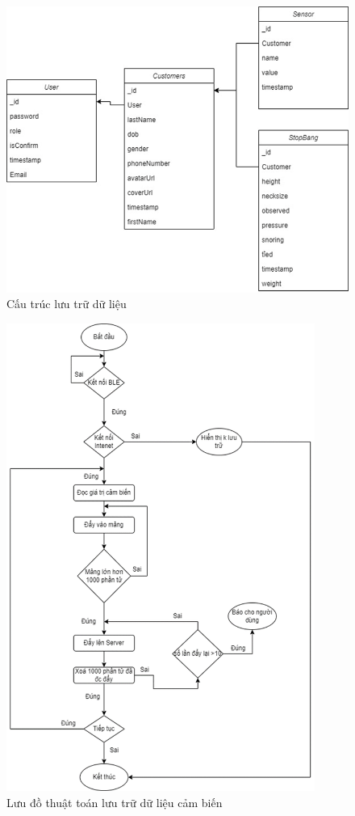 \begin{figure}[!]
		\centering
 		\includegraphics[width=1\textwidth]{images/csdl.png}
		\caption{Cấu trúc lưu trữ dữ liệu}
		\label{cloud}
\end{figure}
\begin{figure}[b!]
		\centering
 		\includegraphics[width=0.9\textwidth]{images/flow_http.png}
		\caption{Lưu đồ thuật toán lưu trữ dữ liệu cảm biến}
		\label{flow_http}
\end{figure}



